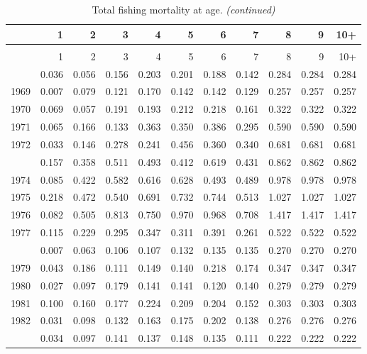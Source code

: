 \documentclass[
]{article}
\begin{document}
\begin{longtable}[t]{lrrrrrrrrrr}
\caption{\label{tab:FAA-tot-table}Total fishing mortality at age.}\\
\toprule
  & 1 & 2 & 3 & 4 & 5 & 6 & 7 & 8 & 9 & 10+\\
\midrule
\endfirsthead
\caption[]{Total fishing mortality at age. \textit{(continued)}}\\
\toprule
  & 1 & 2 & 3 & 4 & 5 & 6 & 7 & 8 & 9 & 10+\\
\midrule
\endhead

\endfoot
\bottomrule
\endlastfoot
1968 & 0.036 & 0.056 & 0.156 & 0.203 & 0.201 & 0.188 & 0.142 & 0.284 & 0.284 & 0.284\\
1969 & 0.007 & 0.079 & 0.121 & 0.170 & 0.142 & 0.142 & 0.129 & 0.257 & 0.257 & 0.257\\
1970 & 0.069 & 0.057 & 0.191 & 0.193 & 0.212 & 0.218 & 0.161 & 0.322 & 0.322 & 0.322\\
1971 & 0.065 & 0.166 & 0.133 & 0.363 & 0.350 & 0.386 & 0.295 & 0.590 & 0.590 & 0.590\\
1972 & 0.033 & 0.146 & 0.278 & 0.241 & 0.456 & 0.360 & 0.340 & 0.681 & 0.681 & 0.681\\
\addlinespace
1973 & 0.157 & 0.358 & 0.511 & 0.493 & 0.412 & 0.619 & 0.431 & 0.862 & 0.862 & 0.862\\
1974 & 0.085 & 0.422 & 0.582 & 0.616 & 0.628 & 0.493 & 0.489 & 0.978 & 0.978 & 0.978\\
1975 & 0.218 & 0.472 & 0.540 & 0.691 & 0.732 & 0.744 & 0.513 & 1.027 & 1.027 & 1.027\\
1976 & 0.082 & 0.505 & 0.813 & 0.750 & 0.970 & 0.968 & 0.708 & 1.417 & 1.417 & 1.417\\
1977 & 0.115 & 0.229 & 0.295 & 0.347 & 0.311 & 0.391 & 0.261 & 0.522 & 0.522 & 0.522\\
\addlinespace
1978 & 0.007 & 0.063 & 0.106 & 0.107 & 0.132 & 0.135 & 0.135 & 0.270 & 0.270 & 0.270\\
1979 & 0.043 & 0.186 & 0.111 & 0.149 & 0.140 & 0.218 & 0.174 & 0.347 & 0.347 & 0.347\\
1980 & 0.027 & 0.097 & 0.179 & 0.141 & 0.141 & 0.120 & 0.140 & 0.279 & 0.279 & 0.279\\
1981 & 0.100 & 0.160 & 0.177 & 0.224 & 0.209 & 0.204 & 0.152 & 0.303 & 0.303 & 0.303\\
1982 & 0.031 & 0.098 & 0.132 & 0.163 & 0.175 & 0.202 & 0.138 & 0.276 & 0.276 & 0.276\\
\addlinespace
1983 & 0.034 & 0.097 & 0.141 & 0.137 & 0.148 & 0.135 & 0.111 & 0.222 & 0.222 & 0.222\\

\end{longtable}
\end{document}
